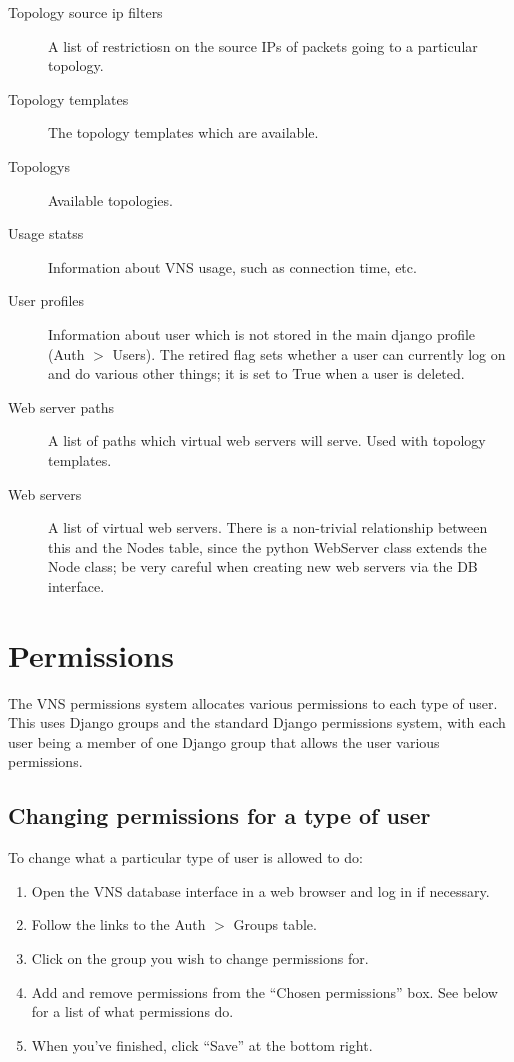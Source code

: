 \documentclass[a4paper,12pt]{report}
\begin{document}
\begin{description}
\item[Topology source ip filters]  A list of restrictiosn on the source IPs of packets going to a particular topology.
\item[Topology templates]  The topology templates which are available.
\item[Topologys]  Available topologies.
\item[Usage statss]  Information about VNS usage, such as connection time, etc.
\item[User profiles]  Information about user which is not stored in the main django profile (Auth $>$ Users).  The retired flag sets whether a user can currently log on and do various other things; it is set to True when a user is deleted.
\item[Web server paths]  A list of paths which virtual web servers will serve.  Used with topology templates.
\item[Web servers]  A list of virtual web servers.  There is a non-trivial relationship between this and the Nodes table, since the python WebServer class extends the Node class; be very careful when creating new web servers via the DB interface.
\end{description}


\section{Permissions}
The VNS permissions system allocates various permissions to each type of user.  This uses Django groups and the standard Django permissions system, with each user being a member of one Django group that allows the user various permissions.

\subsection{Changing permissions for a type of user}
To change what a particular type of user is allowed to do:
\begin{enumerate}
\item Open the VNS database interface in a web browser and log in if necessary.
\item Follow the links to the Auth $>$ Groups table.
\item Click on the group you wish to change permissions for.
\item Add and remove permissions from the ``Chosen permissions'' box.  See below for a list of what permissions do.
\item When you've finished, click ``Save'' at the bottom right.
\end{enumerate}
\end{document}
